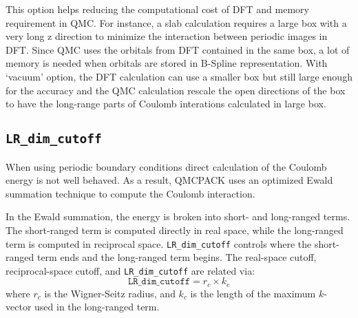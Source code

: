 This option helps reducing the computational cost of DFT and memory requirement in QMC.
For instance, a slab calculation requires a large box with a very long z direction
to minimize the interaction between periodic images in DFT.
Since QMC uses the orbitals from DFT contained in the same box,
a lot of memory is needed when orbitals are stored in B-Spline representation.
With `vacuum' option, the DFT calculation can use a smaller box but still large enough for the accuracy
and the QMC calculation rescale the open directions of the box to
have the long-range parts of Coulomb interations calculated in large box.

\subsection{\texttt{LR\_dim\_cutoff}}
When using periodic boundary conditions direct calculation of the Coulomb energy is
not well behaved. As a result, QMCPACK uses an optimized Ewald summation technique
to compute the Coulomb interaction. %

In the Ewald summation, the energy is broken into short- and long-ranged terms.
The short-ranged term is computed directly in real space, while the long-ranged term is computed in reciprocal space.
\texttt{LR\_dim\_cutoff} controls where the short-ranged term ends and the long-ranged term begins.
The real-space cutoff, reciprocal-space cutoff, and \texttt{LR\_dim\_cutoff} are related via:
\[
\texttt{LR\_dim\_cutoff} = r_{c} \times k_{c}
\]
where $r_{c}$ is the Wigner-Seitz radius, and $k_{c}$ is the length of the maximum $k$-vector used in the long-ranged term.

